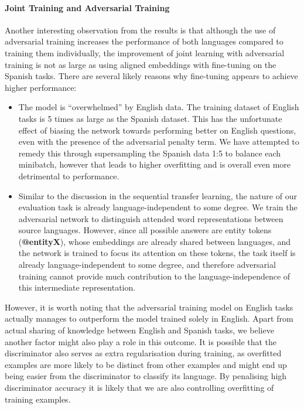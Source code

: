 \documentclass[]{article}
\begin{document}
\paragraph{Joint Training and Adversarial Training}
Another interesting observation from the results is that although the use of adversarial training increases the performance of both languages compared to training them individually, the improvement of joint learning with adversarial training is not as large as using aligned embeddings with fine-tuning on the Spanish tasks. There are several likely reasons why fine-tuning appears to achieve higher performance:
\begin{itemize}
	\item The model is “overwhelmed” by English data. The training dataset of English tasks is 5 times as large as the Spanish dataset. This has the unfortunate effect of biasing the network towards performing better on English questions, even with the presence of the adversarial penalty term. We have attempted to remedy this through supersampling the Spanish data 1:5 to balance each minibatch, however that leads to higher overfitting and is overall even more detrimental to performance.
	\item Similar to the discussion in the sequential transfer learning, the nature of our evaluation task is already language-independent to some degree. We train the adversarial network to distinguish attended word representations between source languages. However, since all possible answers are entity tokens (\textbf{@entityX}), whose embeddings are already shared between languages, and the network is trained to focus its attention on these tokens, the task itself is already language-independent to some degree, and therefore adversarial training cannot provide much contribution to the language-independence of this intermediate representation.
\end{itemize}

However, it is worth noting that the adversarial training model on English tasks actually manages to outperform the model trained solely in English. Apart from actual sharing of knowledge between English and Spanish tasks, we believe another factor might also play a role in this outcome. It is possible that the discriminator also serves as extra regularisation during training, as overfitted examples are more likely to be distinct from other examples and might end up being easier from the discriminator to classify its language. By penalising high discriminator accuracy it is likely that we are also controlling overfitting of training examples.
\end{document}

